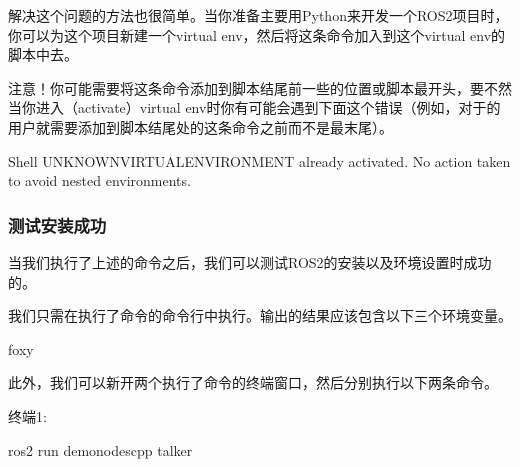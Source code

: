 \documentclass[letterpaper,10pt,english]{sphinxmanual}
\begin{document}
\sphinxAtStartPar
解决这个问题的方法也很简单。当你准备主要用Python来开发一个ROS2项目时，你可以为这个项目新建一个virtual
env，然后将这条命令加入到这个virtual
env的脚本中去。

\sphinxAtStartPar
注意！你可能需要将这条命令添加到脚本结尾前一些的位置或脚本最开头，要不然当你进入（activate）virtual
env时你有可能会遇到下面这个错误（例如，对于的用户就需要添加到脚本结尾处的这条命令之前而不是最末尾）。

\begin{sphinxVerbatim}[commandchars=\\\{\}]
Shell  UNKNOWN\PYGZus{}VIRTUAL\PYGZus{}ENVIRONMENT already activated.
No action taken to avoid nested environments.
\end{sphinxVerbatim}


\subsubsection{测试安装成功}
\label{\detokenize{chapter_rl_sys/ros_code_ex:id3}}
\sphinxAtStartPar
当我们执行了上述的命令之后，我们可以测试ROS2的安装以及环境设置时成功的。

\sphinxAtStartPar
我们只需在执行了命令的命令行中执行。输出的结果应该包含以下三个环境变量。

\begin{sphinxVerbatim}[commandchars=\\\{\}]
foxy
\end{sphinxVerbatim}

\sphinxAtStartPar
此外，我们可以新开两个执行了命令的终端窗口，然后分别执行以下两条命令。

\sphinxAtStartPar
终端1:

\begin{sphinxVerbatim}[commandchars=\\\{\}]
ros2 run demo\PYGZus{}nodes\PYGZus{}cpp talker
\end{sphinxVerbatim}
\end{document}
